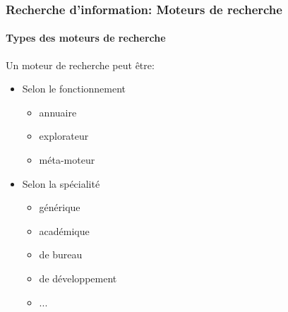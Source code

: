 \documentclass[xcolor=table]{beamer}
\begin{document}
\begin{frame}
\frametitle{Recherche d'information: Moteurs de recherche}
\framesubtitle{Types des moteurs de recherche}

Un moteur de recherche peut être:
\begin{itemize}
	\item Selon le fonctionnement
	\begin{itemize}
		\item annuaire
		\item explorateur
		\item méta-moteur
	\end{itemize}

	\item Selon la spécialité
	\begin{itemize}
		\item générique
		\item académique
		\item de bureau 
		\item de développement
		\item ...
	\end{itemize}
\end{itemize} 

\end{frame}
\end{document}
